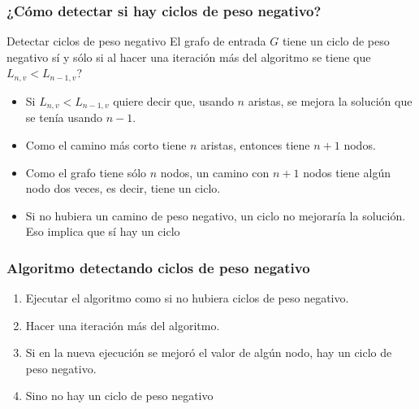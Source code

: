 \documentclass{beamer}
\begin{document}
	\begin{frame}
		\frametitle{¿Cómo detectar si hay ciclos de peso negativo?}
		\begin{block}{Detectar ciclos de peso negativo}
			El grafo de entrada $G$ tiene un ciclo de peso negativo sí y sólo si al hacer una iteración más del algoritmo se tiene que $L_{n, v} < L_{n-1, v}$?
		\end{block}
		\begin{itemize}
			\item Si $L_{n, v} < L_{n-1, v}$ quiere decir que, usando $n$ aristas, se mejora la solución que se tenía usando $n-1$.
			\item Como el camino más corto tiene $n$ aristas, entonces tiene $n+1$ nodos.
			\item Como el grafo tiene sólo $n$ nodos, un camino con $n+1$ nodos tiene algún nodo dos veces, es decir, tiene un ciclo.
			\item Si no hubiera un camino de peso negativo, un ciclo no mejoraría la solución. Eso implica que sí hay un ciclo
		\end{itemize}
	\end{frame}
	
	\begin{frame}
		\frametitle{Algoritmo detectando ciclos de peso negativo}
		\begin{enumerate}
			\item Ejecutar el algoritmo como si no hubiera ciclos de peso negativo.
			\item Hacer una iteración más del algoritmo.
			\item Si en la nueva ejecución se mejoró el valor de algún nodo, hay un ciclo de peso negativo.
			\item Sino no hay un ciclo de peso negativo
		\end{enumerate}
	\end{frame}
	
\end{document}

